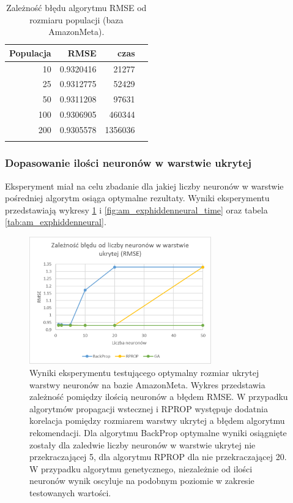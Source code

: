 \documentclass[twoside]{iisthesis}
\begin{document}
			\begin{longtable}{r||rrr}
				\label{tab:am_exppopulation}
				\centering
				\textbf{Populacja} & \textbf{RMSE} & \textbf{czas} \\
				\hline
				10        & 0.9320416  & 21277 \\
				25        & 0.9312775  & 52429 \\
				50        & 0.9311208  & 97631 \\
				100       & 0.9306905  & 460344 \\
				200       & 0.9305578  & 1356036 \\
				\caption{Zależność błędu algorytmu RMSE od rozmiaru populacji (baza AmazonMeta).}
			\end{longtable}
			
			\subsubsection{Dopasowanie ilości neuronów w warstwie ukrytej}
			
				Eksperyment miał na celu zbadanie dla jakiej liczby neuronów w warstwie pośredniej algorytm osiąga optymalne rezultaty. Wyniki eksperymentu przedstawiają wykresy \ref{fig:am_exphiddenneural_rmse} i \ref{fig:am_exphiddenneural_time} oraz tabela \ref{tab:am_exphiddenneural}. 
			
				\begin{figure}[H]
					\centering
					\includegraphics[width=0.7\textwidth]{am_exphiddenneural_rmse}
					\caption{Wyniki eksperymentu testującego optymalny rozmiar ukrytej warstwy neuronów na bazie AmazonMeta. Wykres przedstawia zależność pomiędzy ilością neuronów a błędem RMSE. W przypadku algorytmów propagacji wstecznej i RPROP występuje dodatnia korelacja pomiędzy rozmiarem warstwy ukrytej a błędem algorytmu rekomendacji. Dla algorytmu BackProp optymalne wyniki osiągnięte zostały dla zaledwie liczby neuronów w warstwie ukrytej nie przekraczającej 5, dla algorytmu RPROP dla nie przekraczającej 20. W przypadku algorytmu genetycznego, niezależnie od ilości neuronów wynik oscyluje na podobnym poziomie w zakresie testowanych wartości.}
					\label{fig:am_exphiddenneural_rmse}
				\end{figure}
				
\end{document}
